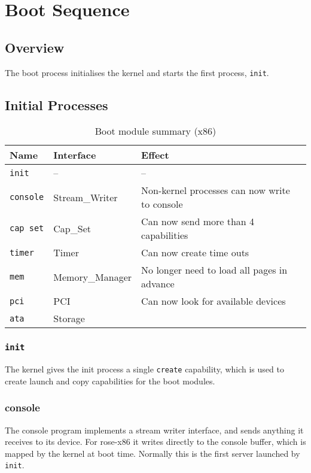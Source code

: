 \chapter{Boot Sequence}

\section{Overview}

The boot process initialises the kernel and starts the first process, {\tt init}.

\section{Initial Processes}

\begin{table}[ht]
\begin{tabular}{l l l}
\hline\hline
Name & Interface & Effect \\
\hline
{\tt init} & -- & -- \\
{\tt console} & Stream\_Writer & Non-kernel processes can now write to console \\
{\tt cap set} & Cap\_Set & Can now send more than 4 capabilities \\
{\tt timer} & Timer & Can now create time outs \\
{\tt mem} & Memory\_Manager & No longer need to load all pages in advance \\
{\tt pci} & PCI & Can now look for available devices \\
{\tt ata} & Storage & \\
\end{tabular}
\caption{Boot module summary (x86)}
\label{table:boot_module_summary}
\end{table}


\subsection{{\tt init}}

The kernel gives the init process a single {\tt create} capability, which is used to create launch and copy capabilities for the boot modules.

\subsection{console}

The console program implements a stream writer interface, and sends anything it receives to its device.  For rose-x86 it writes directly to the console buffer, which is mapped by the kernel at boot time.  Normally this is the first server launched by {\tt init}.

